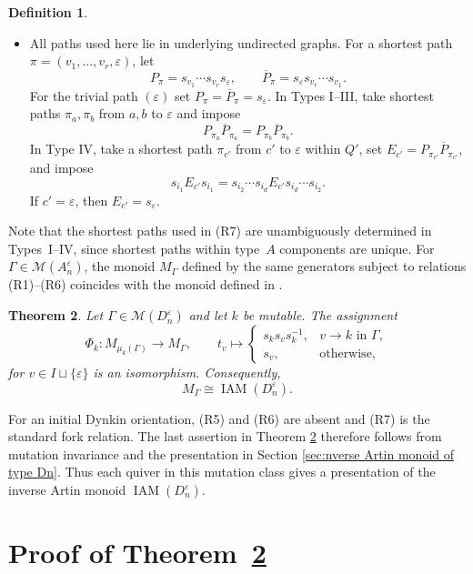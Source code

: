 \documentclass[a4paper, 12pt, reqno]{amsart}
\newtheorem{theorem}{Theorem}[section]
\theoremstyle{definition}
\newtheorem{definition}[theorem]{Definition}
\newcommand{\IAM}{\operatorname{IAM}}
\newcommand{\eps}{\varepsilon}
\begin{document}
\begin{definition}
\begin{itemize}
\item[(R7)]  All paths used here lie in underlying undirected graphs. For a shortest path $\pi=(v_1,\ldots,v_r,\eps)$, let
\[
P_\pi=s_{v_1}\cdots s_{v_r}s_\eps,
\qquad \overline P_\pi=s_\eps s_{v_r}\cdots s_{v_1}.
\]
For the trivial path $(\eps)$ set $P_\pi=\overline P_\pi=s_\eps$. In Types I--III, take shortest paths $\pi_a,\pi_b$ from $a,b$ to $\eps$ and impose
\[P_{\pi_a}\overline P_{\pi_a}=P_{\pi_b}\overline P_{\pi_b}.\]
In Type IV, take a shortest path $\pi_{c'}$ from $c'$ to $\eps$ within $Q'$, set $E_{c'}=P_{\pi_{c'}}\overline P_{\pi_{c'}}$, and impose
\[s_{i_1}E_{c'}s_{i_1}=s_{i_2}\cdots s_{i_d}E_{c'}s_{i_d}\cdots s_{i_2}.\]
If $c'=\eps$, then $E_{c'}=s_\eps$.
\end{itemize}
\end{definition}


Note that the shortest paths used in (R7) are unambiguously determined in Types~I--IV, since shortest paths within type~$A$ components are unique. For $\Gamma\in\mathcal{M}(A_n^{\varepsilon})$, the monoid $M_{\Gamma}$ defined by the same generators subject to relations (R1)--(R6)
coincides with the monoid defined in \cite[Definition 4.1]{Duan2025}.


\begin{theorem}\label{thm:B-mutation-invariance}
Let $\Gamma\in \mathcal{M}(D_n^{\varepsilon})$ and let $k$ be mutable. The assignment
\[
\Phi_k:M_{\mu_k(\Gamma)}\longrightarrow M_\Gamma,
\qquad t_v \longmapsto 
\begin{cases}s_ks_vs_k^{-1},&v\to k\text{ in }\Gamma,\\s_v,&\text{otherwise},\end{cases}
\]
for $v\in I\sqcup\{\eps\}$ is an isomorphism. Consequently,
\[M_\Gamma\cong\IAM(D_n^{\varepsilon}).\]
\end{theorem}
For an initial Dynkin orientation, (R5) and (R6) are absent and (R7) is the standard fork relation. The last assertion in Theorem \ref{thm:B-mutation-invariance} therefore follows from mutation invariance and the presentation in Section \ref{sec:nverse Artin monoid of type Dn}. Thus each quiver in this mutation class gives a presentation of the inverse Artin monoid $\IAM(D_n^{\varepsilon})$.




\section{Proof of Theorem~\ref{thm:B-mutation-invariance}} \label{proof of main theorem}
\end{document}
